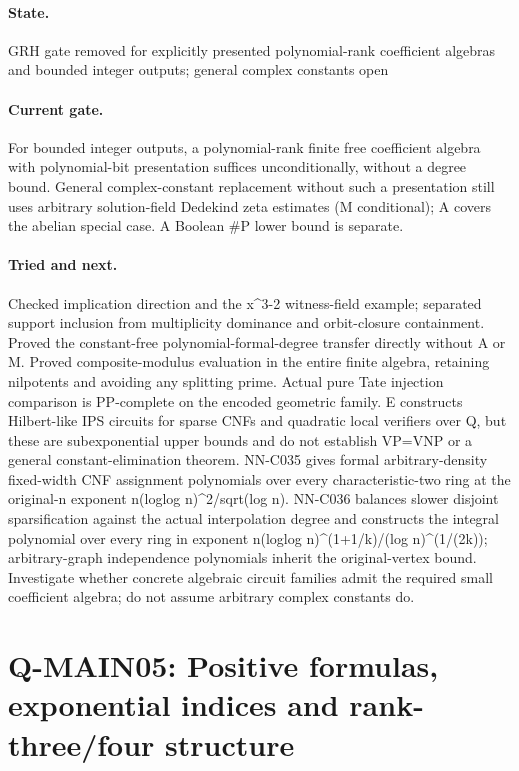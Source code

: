 \paragraph{State.} GRH gate removed for explicitly presented polynomial-rank coefficient algebras and bounded integer outputs; general complex constants open
\paragraph{Current gate.} For bounded integer outputs, a polynomial-rank finite free coefficient algebra with polynomial-bit presentation suffices unconditionally, without a degree bound. General complex-constant replacement without such a presentation still uses arbitrary solution-field Dedekind zeta estimates (M conditional); A covers the abelian special case. A Boolean \#P lower bound is separate.
\paragraph{Tried and next.} Checked implication direction and the x\textasciicircum{}3-2 witness-field example; separated support inclusion from multiplicity dominance and orbit-closure containment. Proved the constant-free polynomial-formal-degree transfer directly without A or M. Proved composite-modulus evaluation in the entire finite algebra, retaining nilpotents and avoiding any splitting prime. Actual pure Tate injection comparison is PP-complete on the encoded geometric family. E constructs Hilbert-like IPS circuits for sparse CNFs and quadratic local verifiers over Q, but these are subexponential upper bounds and do not establish VP=VNP or a general constant-elimination theorem. NN-C035 gives formal arbitrary-density fixed-width CNF assignment polynomials over every characteristic-two ring at the original-n exponent n(loglog n)\textasciicircum{}2/sqrt(log n). NN-C036 balances slower disjoint sparsification against the actual interpolation degree and constructs the integral polynomial over every ring in exponent n(loglog n)\textasciicircum{}(1+1/k)/(log n)\textasciicircum{}(1/(2k)); arbitrary-graph independence polynomials inherit the original-vertex bound. Investigate whether concrete algebraic circuit families admit the required small coefficient algebra; do not assume arbitrary complex constants do.

\section{Q-MAIN05: Positive formulas, exponential indices and rank-three/four structure}
